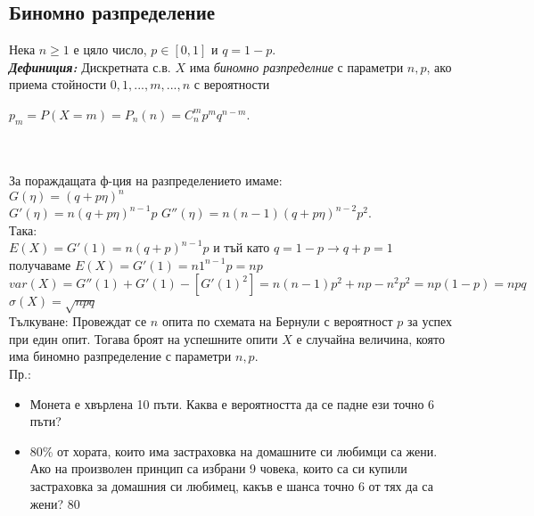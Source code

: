 \documentclass[11pt]{article} %
\newcommand{\italicBold}[1]{\textbf{\emph{#1}}}
\newcommand{\definition}{\italicBold{Дефиниция: }}
\begin{document}
\subsection{Биномно разпределение}
Нека $n \geq 1$ е цяло число, $p \in [0,1]$ и $q=1-p$.\\
\definition Дискретната с.в. $X$ има \textit{биномно разпределние} с параметри $n, p$, ако приема стойности $0,1,...,m,...,n$ с вероятности\\
\centerline{$p_{m}=P(X=m)=P_{n}(n)=C_{n}^{m}p^{m}q^{n-m}$.}\\\\
За пораждащата ф-ция на разпределението имаме:\\
$G(\eta)=(q+p\eta)^{n}$\\
$G'(\eta)=n(q+p\eta)^{n-1}p$
$G''(\eta)=n(n-1)(q+p\eta)^{n-2}p^{2}$.\\ 
Така:\\
$E(X)=G'(1)=n(q+p)^{n-1}p$ и тъй като $q=1-p \rightarrow q+p=1$ получаваме $E(X)=G'(1)=n1^{n-1}p=np$\\
$var(X)=G''(1)+G'(1)-[G'(1)^{2}]=n(n-1)p^{2}+np-n^{2}p^{2}=np(1-p)=npq$\\
$\sigma(X)=\sqrt{npq}$\\

Тълкуване: Провеждат се $n$ опита по схемата на Бернули с вероятност $p$ за успех при един опит. Тогава броят на успешните опити $X$ е случайна величина, която има биномно разпределение с параметри $n, p$.\\
Пр.:
\begin{itemize}
	\item Монета е хвърлена 10 пъти. Каква е вероятността да се падне ези точно 6 пъти?\\
	\item 80\% от хората, които има застраховка на домашните си любимци са жени. Ако на произволен принцип са избрани 9 човека, които са си купили застраховка за домашния си любимец, какъв е шанса точно 6 от тях да са жени? 
	80%
\end{itemize}


 
\end{document}
